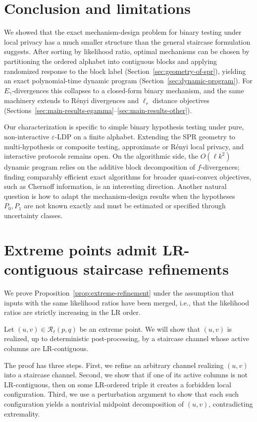 \documentclass{article}
\theoremstyle{plain}
\theoremstyle{definition}
\theoremstyle{plain}
\begin{document}
\section{Conclusion and limitations}
\label{sec:conclusion-and-limitations}
We showed that the exact mechanism-design problem for binary testing under local privacy has a much smaller structure than the general staircase formulation suggests. After sorting by likelihood ratio, optimal mechanisms can be chosen by partitioning the ordered alphabet into contiguous blocks and applying randomized response to the block label (Section~\ref{sec:geometry-of-spr}), yielding an exact polynomial-time dynamic program (Section~\ref{sec:dynamic-program}). For $E_\gamma$-divergences this collapses to a closed-form binary mechanism, and the same machinery extends to R\'enyi divergences and $\ell_r$ distance objectives (Sections~\ref{sec:main-results-egamma}--\ref{sec:main-results-other}).

Our characterization is specific to simple binary hypothesis testing under pure, non-interactive $\varepsilon$-LDP on a finite alphabet. Extending the SPR geometry to multi-hypothesis or composite testing, approximate or R\'enyi local privacy, and interactive protocols remains open. On the algorithmic side, the $O(\ell k^2)$ dynamic program relies on the additive block decomposition of $f$-divergences; finding comparably efficient exact algorithms for broader quasi-convex objectives, such as Chernoff information, is an interesting direction. Another natural question is how to adapt the mechanism-design results when the hypotheses $P_0,P_1$ are not known exactly and must be estimated or specified through uncertainty classes.
\newpage


\newpage
\appendix
\section{Extreme points admit LR-contiguous staircase refinements}
\label{sec:proof-LR-contiguous}

We prove Proposition~\ref{prop:extreme-refinement} under the assumption that inputs with the same likelihood ratios have been merged, i.e., that the likelihood ratios are strictly increasing in the LR order.

Let $(u,v)\in\mathcal R_\ell(p,q)$ be an extreme point. We will show that $(u,v)$ is realized, up to deterministic post-processing, by a staircase channel whose active columns are LR-contiguous.

The proof has three steps. First, we refine an arbitrary channel realizing $(u,v)$ into a staircase channel. Second, we show that if one of its active columns is not LR-contiguous, then on some LR-ordered triple it creates a forbidden local configuration. Third, we use a perturbation argument to show that each such configuration yields a nontrivial midpoint decomposition of $(u,v)$, contradicting extremality.
\end{document}
